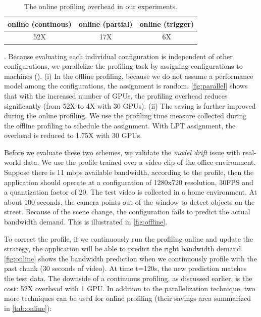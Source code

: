 
\begin{table}[t]
  \centering
  \begin{tabular}{c c c}
    \toprule
    online (continous) & online (partial) & online (trigger) \\
    \midrule
    52X   & 17X              & 6X \\
    \bottomrule
  \end{tabular}
  \caption{The online profiling overhead in our experiments.}
  \label{tab:online}
\end{table}

. Because evaluating each
individual configuration is independent of other configurations, we parallelize
the profiling task by assigning configurations to machines (). (i) In the offline profiling, because we do not assume a
performance model among the configurations, the assignment is
random. \autoref{fig:parallel} shows that with the increased number of GPUs, the
profiling overhead reduces significantly (from 52X to 4X with 30 GPUs). (ii) The
saving is further improved during the online profiling. We use the profiling
time measure collected during the offline profiling to schedule the
assignment. With LPT assignment, the overhead is reduced to 1.75X with 30 GPUs.

 Before we evaluate these two
schemes, we validate the \textit{model drift} issue with real-world data. We use
the profile trained over a video clip of the office environment. Suppose there
is 11 mbps available bandwidth, according to the profile, then the application
should operate at a configuration of 1280x720 resolution, 30FPS and a
quantization factor of 20. The test video is collected in a home environment. At
about 100 seconds, the camera points out of the window to detect objects on the
street.  Because of the scene change, the configuration fails to predict the
actual bandwidth demand. This is illustrated in \autoref{fig:offline}.

To correct the profile, if we continuously run the profiling online and update
the strategy, the application will be able to predict the right bandwidth
demand. \autoref{fig:online} shows the bandwidth prediction when we continuously
profile with the past chunk (30 seconds of video). At time t=120s, the new
prediction matches the test data. The downside of a continuous profiling, as
discussed earlier, is the cost: 52X overhead with 1 GPU. In addition to the
parallelization technique, two more techniques can be used for online profiling
(their savings area summarized in \autoref{tab:online}):

